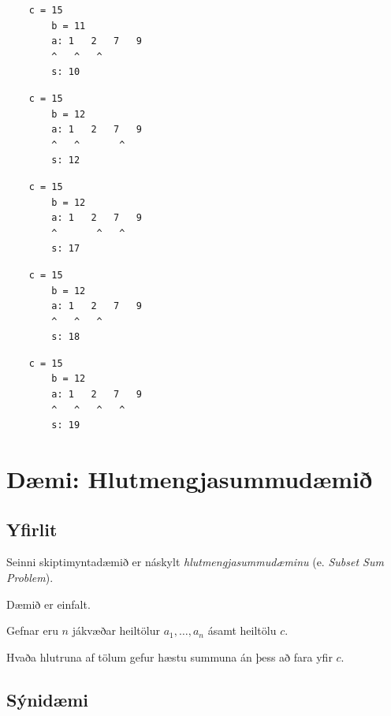 { \begin{verbatim}
    c = 15
        b = 11
        a: 1   2   7   9
        ^   ^   ^        
        s: 10
        \end{verbatim} }

{ \begin{verbatim}
    c = 15
        b = 12
        a: 1   2   7   9
        ^   ^       ^    
        s: 12
        \end{verbatim} }

{ \begin{verbatim}
    c = 15
        b = 12
        a: 1   2   7   9
        ^       ^   ^    
        s: 17
        \end{verbatim} }

{ \begin{verbatim}
    c = 15
        b = 12
        a: 1   2   7   9
        ^   ^   ^    
        s: 18
        \end{verbatim} }

{ \begin{verbatim}
    c = 15
        b = 12
        a: 1   2   7   9
        ^   ^   ^   ^    
        s: 19
        \end{verbatim} }

\section{Dæmi: Hlutmengjasummudæmið}
\subsection{Yfirlit}
{
    {
        \item<1-> Seinni skiptimyntadæmið er náskylt \emph{hlutmengjasummudæminu} (e. \emph{Subset Sum Problem}).
        \item<2-> Dæmið er einfalt.
        \item<3-> Gefnar eru $n$ jákvæðar heiltölur $a_1, \dots, a_n$ ásamt heiltölu $c$.
        \item<4-> Hvaða hlutruna af tölum gefur hæstu summuna án þess að fara yfir $c$.
    }
}

\subsection{Sýnidæmi}
{
}

